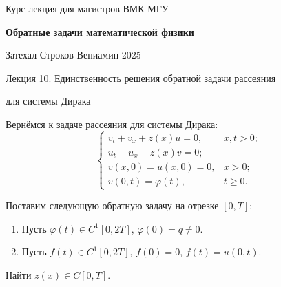 \documentclass{article}
\begin{document}
\centerline{\large Курс лекция для магистров ВМК МГУ}
\centerline {\textbf{\LARGE Обратные задачи математической физики}}
\centerline {Затехал Строков Вениамин 2025}

\vspace{0.4cm}

\centerline{\LARGE 	Лекция 10. Единственность решения обратной задачи рассеяния}
\centerline{\LARGE для системы Дирака }

\vspace{0.5cm}


Вернёмся к задаче рассеяния для системы Дирака:
\begin{equation}
\begin{cases}
	v_t + v_x + z(x)u = 0, & x,t>0;\\
	u_t - u_x - z(x)v = 0;\\
	v(x,0) = u(x,0) = 0, & x > 0;\\
	v(0,t) = \varphi(t), & t \geqslant 0.
\end{cases}
\label{Dirak system}
\end{equation}

Поставим следующую обратную задачу на отрезке $[0,T]$:
\begin{enumerate}
	\item Пусть $\varphi(t) \in C^1[0,2T]$, $\varphi(0) = q \neq 0$.
	\item Пусть $f(t) \in C^1[0,2T]$, $f(0) = 0$, $f(t) = u(0,t)$.
\end{enumerate}

Найти $z(x) \in C[0,T]$.
\end{document}
